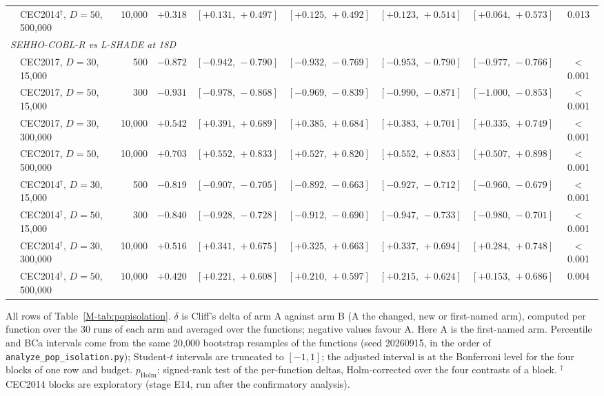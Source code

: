\begin{table}[htbp]
{\begin{tabular}{llrrccccc}
\quad & CEC2014$^{\dagger}$, $D{=}50$, 500{,}000 & 10{,}000 & $+0.318$ & $[+0.131,\,+0.497]$ & $[+0.125,\,+0.492]$ & $[+0.123,\,+0.514]$ & $[+0.064,\,+0.573]$ & 0.013 \\
\multicolumn{9}{l}{\emph{SEHHO-COBL-R vs L-SHADE at 18D}} \\
\quad & CEC2017, $D{=}30$, 15{,}000 & 500 & $-0.872$ & $[-0.942,\,-0.790]$ & $[-0.932,\,-0.769]$ & $[-0.953,\,-0.790]$ & $[-0.977,\,-0.766]$ & $<$0.001 \\
\quad & CEC2017, $D{=}50$, 15{,}000 & 300 & $-0.931$ & $[-0.978,\,-0.868]$ & $[-0.969,\,-0.839]$ & $[-0.990,\,-0.871]$ & $[-1.000,\,-0.853]$ & $<$0.001 \\
\quad & CEC2017, $D{=}30$, 300{,}000 & 10{,}000 & $+0.542$ & $[+0.391,\,+0.689]$ & $[+0.385,\,+0.684]$ & $[+0.383,\,+0.701]$ & $[+0.335,\,+0.749]$ & $<$0.001 \\
\quad & CEC2017, $D{=}50$, 500{,}000 & 10{,}000 & $+0.703$ & $[+0.552,\,+0.833]$ & $[+0.527,\,+0.820]$ & $[+0.552,\,+0.853]$ & $[+0.507,\,+0.898]$ & $<$0.001 \\
\quad & CEC2014$^{\dagger}$, $D{=}30$, 15{,}000 & 500 & $-0.819$ & $[-0.907,\,-0.705]$ & $[-0.892,\,-0.663]$ & $[-0.927,\,-0.712]$ & $[-0.960,\,-0.679]$ & $<$0.001 \\
\quad & CEC2014$^{\dagger}$, $D{=}50$, 15{,}000 & 300 & $-0.840$ & $[-0.928,\,-0.728]$ & $[-0.912,\,-0.690]$ & $[-0.947,\,-0.733]$ & $[-0.980,\,-0.701]$ & $<$0.001 \\
\quad & CEC2014$^{\dagger}$, $D{=}30$, 300{,}000 & 10{,}000 & $+0.516$ & $[+0.341,\,+0.675]$ & $[+0.325,\,+0.663]$ & $[+0.337,\,+0.694]$ & $[+0.284,\,+0.748]$ & $<$0.001 \\
\quad & CEC2014$^{\dagger}$, $D{=}50$, 500{,}000 & 10{,}000 & $+0.420$ & $[+0.221,\,+0.608]$ & $[+0.210,\,+0.597]$ & $[+0.215,\,+0.624]$ & $[+0.153,\,+0.686]$ & 0.004 \\
\bottomrule
\end{tabular}}
\begin{flushleft}\footnotesize
All rows of Table~\ref{M-tab:popisolation}. $\delta$ is Cliff's delta of arm A against arm B (A the changed, new or first-named arm), computed per function over the 30 runs of each arm and averaged over the functions; negative values favour A. Here A is the first-named arm. Percentile and BCa intervals come from the same 20{,}000 bootstrap resamples of the functions (seed 20260915, in the order of \texttt{analyze\_pop\_isolation.py}); Student-$t$ intervals are truncated to $[-1,1]$; the adjusted interval is at the Bonferroni level for the four blocks of one row and budget. $p_{\text{Holm}}$: signed-rank test of the per-function deltas, Holm-corrected over the four contrasts of a block. $^{\dagger}$ CEC2014 blocks are exploratory (stage E14, run after the confirmatory analysis).
\end{flushleft}
\end{table}
